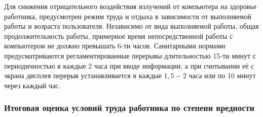 Для снижения отрицательного воздействия излучений от компьютера
на здоровье работника, предусмотрен режим труда и отдыха в зависимости от выполняемой
работы и возраста пользователя. Независимо от вида выполняемой работы, общая
продолжительность работы, примерное время непосредственной работы с компьютером
не должно превышать 6-ти часов. Санитарными нормами предусматриваются регламентированные
перерывы длительностью 15-ти минут с периодичностью в каждые 2 часа при вводе
информации, а при считывании её с экрана дисплея перерыв устанавливается в
каждые $1,5 - 2$ часа или по 10 минут через каждый час.




\subsubsection{Итоговая оценка условий труда работника по степени вредности}

